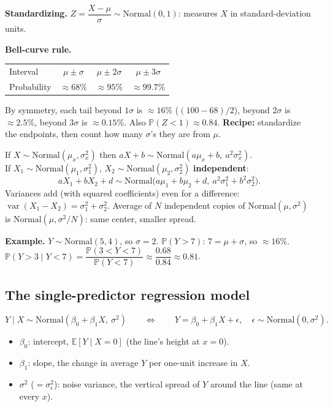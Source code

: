 \documentclass[11pt]{article}
\newcommand{\E}{\mathbb{E}}
\newcommand{\Var}{\operatorname{var}}
\renewcommand{\P}{\mathbb{P}}
\newcommand{\given}{\mid}
\newcommand{\Norm}{\text{Normal}}
\begin{document}
\textbf{Standardizing.} $Z=\dfrac{X-\mu}{\sigma}\sim\Norm(0,1)$: measures $X$ in standard-deviation units.

\textbf{Bell-curve rule.}
\begin{center}
\begin{tabular}{@{}lccc@{}}
\toprule
Interval & $\mu\pm\sigma$ & $\mu\pm2\sigma$ & $\mu\pm3\sigma$\\
Probability & $\approx68\%$ & $\approx95\%$ & $\approx99.7\%$\\
\bottomrule
\end{tabular}
\end{center}
By symmetry, each tail beyond $1\sigma$ is $\approx16\%$ ($(100-68)/2$), beyond $2\sigma$ is $\approx2.5\%$, beyond $3\sigma$ is $\approx0.15\%$.
Also $\P(Z<1)\approx0.84$. \textbf{Recipe:} standardize the endpoints, then count how many $\sigma$'s they are from $\mu$.

\begin{keybox}[title={Linear transformations and sums}]
If $X\sim\Norm(\mu_x,\sigma_x^2)$ then $aX+b\sim\Norm(a\mu_x+b,\ a^2\sigma_x^2)$.\\
If $X_1\sim\Norm(\mu_1,\sigma_1^2)$, $X_2\sim\Norm(\mu_2,\sigma_2^2)$ \textbf{independent}:
\[
aX_1+bX_2+d\sim\Norm\big(a\mu_1+b\mu_2+d,\ a^2\sigma_1^2+b^2\sigma_2^2\big).
\]
Variances add (with squared coefficients) even for a difference: $\Var(X_1-X_2)=\sigma_1^2+\sigma_2^2$.
Average of $N$ independent copies of $\Norm(\mu,\sigma^2)$ is $\Norm(\mu,\sigma^2/N)$: same center, smaller spread.
\end{keybox}

\textbf{Example.} $Y\sim\Norm(5,4)$, so $\sigma=2$. $\P(Y>7)$: $7=\mu+\sigma$, so $\approx16\%$. $\P(Y>3\given Y<7)=\dfrac{\P(3<Y<7)}{\P(Y<7)}\approx\dfrac{0.68}{0.84}\approx0.81$.

\subsection{The single-predictor regression model}
\[
Y\given X\sim\Norm(\beta_0+\beta_1X,\ \sigma^2)\qquad\Longleftrightarrow\qquad Y=\beta_0+\beta_1X+\epsilon,\quad \epsilon\sim\Norm(0,\sigma^2).
\]
\begin{itemize}[leftmargin=*,itemsep=2pt]
  \item $\beta_0$: intercept, $\E[Y\given X=0]$ (the line's height at $x=0$).
  \item $\beta_1$: slope, the change in average $Y$ per one-unit increase in $X$.
  \item $\sigma^2$ ($=\sigma_\epsilon^2$): noise variance, the vertical spread of $Y$ around the line (same at every $x$).
\end{itemize}
\end{document}
